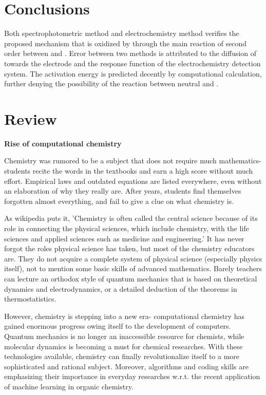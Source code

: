 \documentclass[%
preprint,
 amsmath,amssymb,
 aps,
10.5pt,
]{revtex4-1}
\newcommand{\xiaosan}{\fontsize{15pt}{22pt}\selectfont}    %
\newcommand{\xiaosi}{\fontsize{12pt}{18pt}\selectfont}
\newcommand{\wuhao}{\fontsize{10.5pt}{10.5pt}\selectfont}    %
\begin{document}
\section{Conclusions}
Both spectrophotometric method and electrochemistry method verifies the proposed mechanism that  is oxidized by  through the main reaction of second order between  and . Error between two methods is attributed to the diffusion of  towards the electrode and the response function of the electrochemistry detection system. The activation energy is predicted decently by computational calculation, further denying the possibility of the reaction between neutral  and .


\newpage
\section*{Review}
\wuhao
\begin{center}
\xiaosan\textbf{Rise of computational chemistry}

\xiaosi{ Rui Li (3160102098)}
\end{center}
Chemistry was rumored to be a subject that does not require much mathematics- students recite the words in the textbooks and earn a high score without much effort. Empirical laws and outdated equations are listed everywhere, even without an elaboration of why they really are. After years, students find themselves forgotten almost everything, and fail to give a clue on what chemistry is.

As wikipedia puts it, 'Chemistry is often called the central science because of its role in connecting the physical sciences, which include chemistry, with the life sciences and applied sciences such as medicine and engineering.' It has never forgot the roles physical science has taken, but most of the chemistry educators are. They do not acquire a complete system of physical science (especially physics itself), not to mention some basic skills of advanced mathematics. Barely teachers can lecture an orthodox style of quantum mechanics that is based on theoretical dynamics and electrodynamics, or a detailed deduction of the theorems in thermostatistics.

However, chemistry is stepping into a new era- computational chemistry has gained enormous progress owing itself to the development of computers. Quantum mechanics is no longer an inaccessible resource for chemists, while molecular dynamics is becoming a must for chemical researches. With these technologies available, chemistry can finally revolutionalize itself to a more sophisticated and rational subject. Moreover, algorithms and coding skills are emphasizing their importance in everyday researches w.r.t. the recent application of machine learning in organic chemistry.
\end{document}

